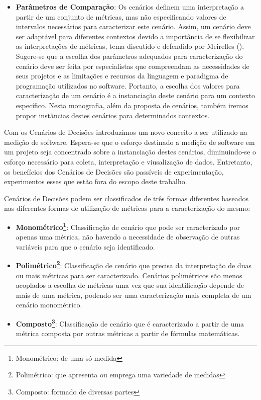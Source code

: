 \begin{itemize}
\item \textbf{Parâmetros de Comparação}: Os cenários definem uma interpretação a partir de um conjunto de métricas, mas não especificando valores de intervalos necessários para caracterizar este cenário. Assim, um cenário deve ser adaptável para diferentes contextos devido a importância de se flexibilizar as interpretações de métricas, tema discutido e defendido por Meirelles (\citeyear{meirelles2013metrics}). Sugere-se que a escolha dos parâmetros adequados para caracterização do cenário deve ser feita por especialistas que compreendam as necessidades de seus projetos e as limitações e recursos da linguagem e paradigma de programação utilizados no software. Portanto, a escolha dos valores para caracterização de um cenário é a instanciação deste cenário para um contexto específico. Nesta monografia, além da proposta de cenários, também iremos propor instâncias destes cenários para determinados contextos.
\end{itemize}

%

Com os Cenários de Decisões introduzimos um novo conceito a ser utilizado na medição de software. Espera-se que o esforço destinado a medição de software em um projeto seja concentrado sobre a instanciação destes cenários, diminuindo-se o esforço necessário para coleta, interpretação e viusalização de dados. Entretanto, os benefícios dos Cenários de Decisões são passíveis de experimentação, experimentos esses que estão fora do escopo deste trabalho.

%

Cenários de Decisões podem ser classificados de três formas diferentes baseados nas diferentes formas de utilização de métricas para a caracterização do mesmo:

\begin{itemize}
\item \textbf{Monométrico\footnote{Monométrico: de uma só medida}}: Classificação de cenário que pode ser caracterizado por apenas uma métrica, não havendo a necessidade de observação de outras variáveis para que o cenário seja identificado.
\item \textbf{Polimétrico\footnote{Polimétrico: que apresenta ou emprega uma variedade de medidas}}: Classificação de cenário que precisa da interpretação de duas ou mais métricas para ser caracterizado. Cenários polimétricos são menos acoplados a escolha de métricas uma vez que sua identificação depende de mais de uma métrica, podendo ser uma caracterização mais completa de um cenário monométrico. 
\item \textbf{Composto\footnote{Composto: formado de diversas partes}}: Classificação de cenário que é caracterizado a partir de uma métrica composta por outras métricas a partir de fórmulas matemáticas.
\end{itemize}

